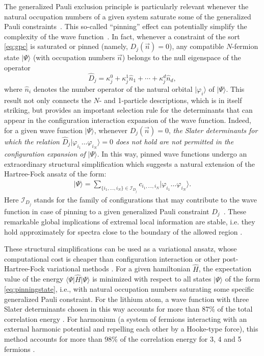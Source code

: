 \documentclass[aps,twocolumn,showpacs,pra,superscriptaddress,floatfix,longbibliography]{revtex4-1}
\newcommand{\7}{\dagger}
\newcommand{\bra}[1]{\mbox{$\langle #1 |$}}
\newcommand{\ket}[1]{\mbox{$| #1 \rangle$}}
\begin{document}
The generalized Pauli exclusion principle is particularly 
relevant whenever the natural occupation numbers of 
a given system saturate some of the generalized Pauli constraints~\cite{Kly1}. This so-called ``pinning'' effect
can potentially simplify the complexity of the wave function~\cite{CSHFZPC}. 
In fact, whenever a constraint of the sort \eqref{eq:gpc} is 
saturated or pinned (namely, $D_j(\vec{n}) = 0$), any 
compatible $N$-fermion state $\ket{\Psi}$ (with occupation 
numbers $\vec{n}$) belongs to the null eigenspace of the 
operator
\begin{equation}
  \label{eq:gpcop}
\hat{D}_{j} =  \kappa^{0}_j + \kappa^{1}_j \hat{n}_1 + \cdots
  + \kappa^{d}_j \hat{n}_d,
  \end{equation}
where $\hat{n}_i$ denotes the number operator of
the natural orbital $\ket{\varphi_i}$ of $\ket{\Psi}$.  
This result not only connects the $N$- and 1-particle descriptions,
which is in itself striking, but provides an important selection rule 
for the determinants that can appear in the configuration interaction expansion of the wave function. Indeed, for a given wave function 
$\ket{\Psi}$, 
whenever  $D_j(\vec{n}) = 0$, 
\textit{the Slater determinants for which the relation
$\hat{D}_j\ket{\varphi_{i_1}\ldots\varphi_{i_N}} = 0$ does not 
hold are not permitted in the configuration expansion of $\ket{\Psi}$}. 
In this way, pinned wave functions undergo an extraordinary structural 
simplification which suggests a natural extension 
 of the Hartree-Fock ansatz of the form:
\begin{align}
\ket{\Psi} = \sum_{\{i_1,\ldots, i_N\}\in \mathcal{I}_{D_j}} c_{i_1,\ldots, i_N} \ket{\varphi_{i_1}\ldots\varphi_{i_N}}.
\label{eq:pinningstate}
\end{align}
Here $\mathcal{I}_{D_j}$ stands for the family of configurations 
that may contribute to the wave function in case of pinning to a 
given generalized Pauli constraint $D_j$~\cite{CSHFZPC}. 
These remarkable global implications of extremal local information 
are stable, i.e. they hold approximately for spectra close to the 
boundary of the allowed region \cite{SBV}.

These structural simplifications can be used as a variational 
ansatz, whose computational cost is  cheaper than 
configuration interaction or other post-Hartree-Fock
variational methods \cite{CS2013,CSHFZPC,SBV}. 
For a given hamiltonian $\hat H$, the expectation value 
of the energy $\bra{\Psi}\hat{H}\ket{\Psi}$ 
is minimized with respect to all states $\ket{\Psi}$ of the form  \eqref{eq:pinningstate}, i.e., with natural occupation numbers 
saturating some specific generalized Pauli constraint. For the 
lithium atom, a wave function with three Slater determinants chosen 
in this way accounts for more than 87\% of the total correlation energy
\cite{CSHFZPC}. For harmonium (a system of fermions interacting 
with an external harmonic potential and repelling each other by a 
Hooke-type force), this method accounts for more than 98\% of the 
correlation energy for 3, 4 and 5 fermions \cite{Benavidestesis}.
\end{document}
